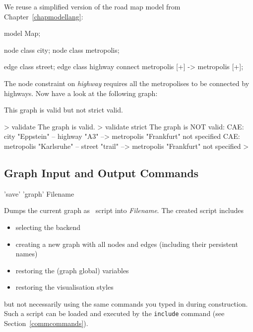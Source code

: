\begin{example}
We reuse a simplified version of the road map model from Chapter~\ref{chapmodellang}:
\begin{grgen} 
model Map;

node class city;
node class metropolis;

edge class street;
edge class highway
      connect metropolis [+] -> metropolis [+];
\end{grgen}
The node constraint on \emph{highway} requires all the metropolises to be connected by highways. Now have a look at the following graph:
\begin{center}
\end{center}

This graph is valid but not strict valid.
\begin{grshell} 
> validate
The graph is valid.
> validate strict
The graph is NOT valid:
  CAE: city "Eppstein" -- highway "A3" --> metropolis "Frankfurt" not specified
  CAE: metropolis "Karlsruhe" -- street "trail" --> metropolis "Frankfurt" not specified
>
\end{grshell}
\end{example}


\pagebreak

\subsection{Graph Input and Output Commands}
\label{outputcmds}

\begin{rail}
  'save' 'graph' Filename
\end{rail}
Dumps the current graph as \GrShell\ script into \emph{Filename}.
The created script includes
\begin{itemize}
  \item selecting the backend
  \item creating a new graph with all nodes and edges (including their persistent names)
  \item restoring the (graph global) variables
  \item restoring the visualisation styles
\end{itemize}
but not necessarily using the same commands you typed in during construction. 
Such a script can be loaded and executed by the \texttt{include} command (see Section~\ref{commcommands}).

